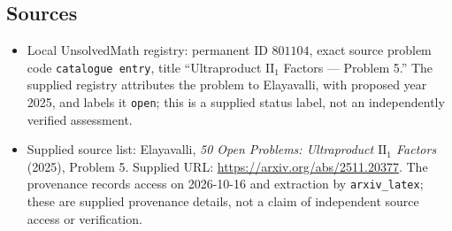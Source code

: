 \documentclass[11pt]{article}
\begin{document}
\subsection{Sources}
\begin{itemize}
\item Local UnsolvedMath registry: permanent ID \(801104\), exact source problem code \texttt{catalogue entry}, title ``Ultraproduct \(\mathrm{II}_1\) Factors --- Problem 5.'' The supplied registry attributes the problem to Elayavalli, with proposed year 2025, and labels it \texttt{open}; this is a supplied status label, not an independently verified assessment.
\item Supplied source list: Elayavalli, \emph{50 Open Problems: Ultraproduct \(\mathrm{II}_1\) Factors} (2025), Problem 5. Supplied URL: \url{https://arxiv.org/abs/2511.20377}. The provenance records access on 2026-10-16 and extraction by \texttt{arxiv\_latex}; these are supplied provenance details, not a claim of independent source access or verification.
\end{itemize}
\end{document}
